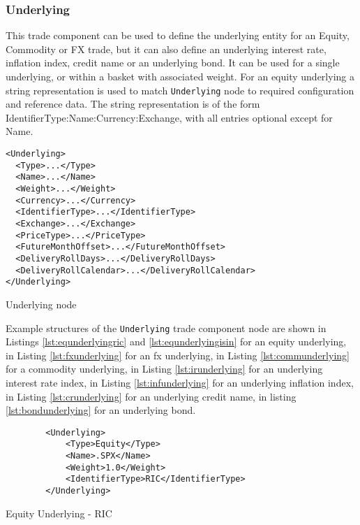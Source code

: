 \subsubsection{Underlying}
\label{ss:underlying}

This trade component can be used to define the underlying entity for an Equity, Commodity or FX trade, but it can also define an underlying interest rate, inflation index, credit name or an underlying bond. It can be used for a single underlying, or within a basket with associated weight.
For an equity underlying a string representation is used to match \lstinline!Underlying! node to required configuration and reference data. The string representation is of the form {IdentifierType}:{Name}:{Currency}:{Exchange}, with all entries optional except for Name.

\begin{listing}[H]
\begin{verbatim}
<Underlying>
  <Type>...</Type>
  <Name>...</Name>
  <Weight>...</Weight>
  <Currency>...</Currency>
  <IdentifierType>...</IdentifierType>
  <Exchange>...</Exchange>
  <PriceType>...</PriceType>
  <FutureMonthOffset>...</FutureMonthOffset>
  <DeliveryRollDays>...</DeliveryRollDays>
  <DeliveryRollCalendar>...</DeliveryRollCalendar>
</Underlying>
\end{verbatim}
\caption{Underlying node}
\label{lst:underlying}
\end{listing}

Example structures of the \lstinline!Underlying! trade component node are shown in Listings \ref{lst:equnderlyingric} and \ref{lst:equnderlyingisin} for
an equity underlying, in Listing \ref{lst:fxunderlying} for an fx underlying, in Listing \ref{lst:communderlying} for
a commodity underlying, in Listing \ref{lst:irunderlying} for an underlying interest rate index, in Listing \ref{lst:infunderlying} for an underlying inflation index, in Listing \ref{lst:crunderlying} for an underlying credit name, in listing \ref{lst:bondunderlying} for an underlying bond.

\begin{listing}[H]
\begin{verbatim}
        <Underlying>
            <Type>Equity</Type>
            <Name>.SPX</Name>
            <Weight>1.0</Weight>
            <IdentifierType>RIC</IdentifierType>
        </Underlying>
\end{verbatim}
\caption{Equity Underlying - RIC}
\label{lst:equnderlyingric}
\end{listing}


